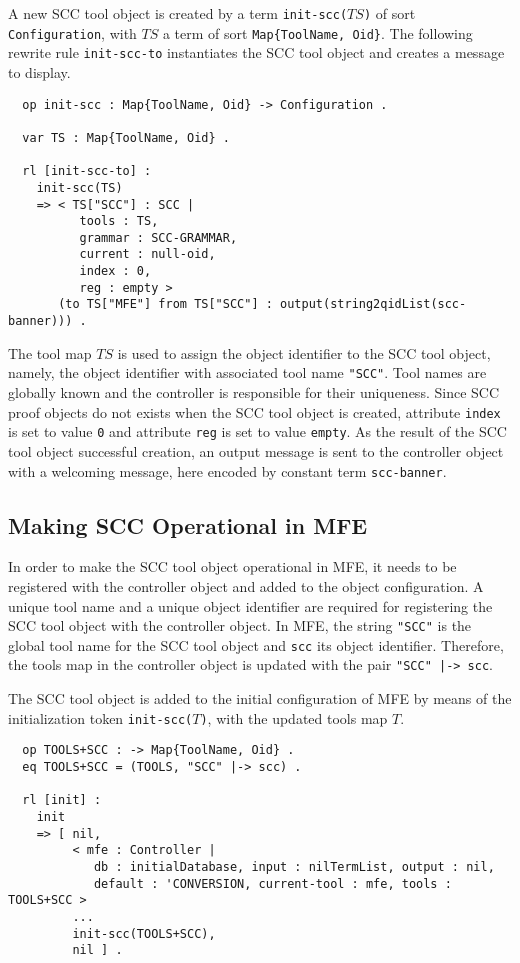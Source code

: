A new SCC tool object is created by 
a term {\tt init-scc(}$\textit{TS}${\tt)} of sort
{\tt Configuration}, with $\textit{TS}$ a term
of sort \verb~Map{ToolName, Oid}~. 
The following rewrite rule {\tt init-scc-to} instantiates
the SCC tool object and creates a message to display.

\begin{small}
\begin{verbatim}
  op init-scc : Map{ToolName, Oid} -> Configuration .

  var TS : Map{ToolName, Oid} .

  rl [init-scc-to] :
    init-scc(TS)
    => < TS["SCC"] : SCC | 
          tools : TS,
          grammar : SCC-GRAMMAR, 
          current : null-oid, 
          index : 0, 
          reg : empty >
       (to TS["MFE"] from TS["SCC"] : output(string2qidList(scc-banner))) .
\end{verbatim}
\end{small}
%
The tool map $\textit{TS}$ is used to 
assign the object identifier to the SCC tool object, namely,
the object identifier with associated tool name {\tt "SCC"}.
Tool names are globally known and the controller is responsible 
for their uniqueness.
Since SCC proof objects do not exists when the SCC tool object is
created, attribute {\tt index} is set to value {\tt 0} and
attribute {\tt reg} is set to value {\tt empty}.
As the result of the SCC tool
object successful creation, an output message is sent to the controller object
with a welcoming message, here encoded by constant term {\tt scc-banner}.


\subsection{Making SCC Operational in MFE}

In order to make the SCC tool object operational in MFE,
it needs to be registered with the controller object
and added to the object configuration.
A unique tool name and a unique object identifier 
are required for registering the SCC tool object with
the controller object. In MFE, the string {\tt "SCC"}
is the global tool name for the SCC tool object and 
{\tt scc} its object identifier.
Therefore, the tools map in the controller object
is updated with the pair {\tt "SCC" |-> scc}.

The SCC tool object is added to
the initial configuration of MFE by means of the initialization
token {\tt init-scc($T$)}, with the updated tools map $T$.

{\small
\begin{verbatim}
  op TOOLS+SCC : -> Map{ToolName, Oid} .
  eq TOOLS+SCC = (TOOLS, "SCC" |-> scc) .

  rl [init] :
    init
    => [ nil,
         < mfe : Controller | 
            db : initialDatabase, input : nilTermList, output : nil,
            default : 'CONVERSION, current-tool : mfe, tools : TOOLS+SCC >
         ... 
         init-scc(TOOLS+SCC), 
         nil ] .
\end{verbatim}
}

